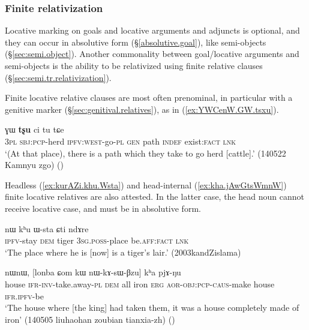 \subsubsection{Finite relativization}  \label{sec:locative.relativization.finite}
Locative marking on goals and locative arguments and adjuncts is optional, and they can occur in absolutive form (§\ref{absolutive.goal}), like semi-objects (§\ref{sec:semi.object}). Another commonality between goal/locative arguments and semi-objects is the ability to be relativized using finite relative clauses (§\ref{sec:semi.tr.relativization}). 

Finite locative relative clauses are most often prenominal, in particular with a genitive marker (§\ref{sec:genitival.relatives}), as in (\ref{ex:YWCenW.GW.tsxu}).

\begin{exe}
\ex \label{ex:YWCenW.GW.tsxu}
 ɣɯ \textbf{tʂu} ci tu tɕe  \\
\textsc{3pl} \textsc{sbj}:\textsc{pcp}-herd \textsc{ipfv}:\textsc{west}-go-\textsc{pl} \textsc{gen} path \textsc{indef} exist:\textsc{fact} \textsc{lnk} \\
\glt `(At that place), there is a path which they take to go herd [cattle].' (140522 Kamnyu zgo)
()
\end{exe} 

Headless (\ref{ex:kurAZi.khu.Wsta}) and head-internal (\ref{ex:kha.jAwGtsWmnW}) finite locative relatives are also attested. In the latter case, the head noun cannot receive locative case, and must be in absolutive form.

\begin{exe}
\ex \label{ex:kurAZi.khu.Wsta}
\gll [ku-rɤʑi] nɯ kʰu ɯ-sta ɕti ndɤre \\
\textsc{ipfv}-stay \textsc{dem} tiger \textsc{3sg}.\textsc{poss}-place be.\textsc{aff}:\textsc{fact} \textsc{lnk} \\
\glt `The place where he is [now] is a tiger's lair.' (2003kandZislama)
\end{exe} 

\begin{exe}
\ex \label{ex:kha.jAwGtsWmnW}
 nɯnɯ,  [lonba ɕom kɯ nɯ-kɤ-sɯ-βzu] kʰa pjɤ-ŋu \\
house \textsc{ifr}-\textsc{inv}-take.away-\textsc{pl} \textsc{dem} all iron \textsc{erg} \textsc{aor}-\textsc{obj}:\textsc{pcp}-\textsc{caus}-make house \textsc{ifr}.\textsc{ipfv}-be \\
\glt `The house where [the king] had taken them, it was a house completely made of iron' (140505 liuhaohan zoubian tianxia-zh)
()
\end{exe}

